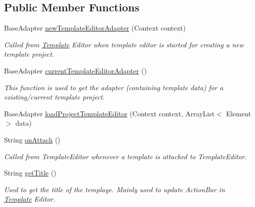 \subsection*{Public Member Functions}
\begin{DoxyCompactItemize}
\item 
Base\-Adapter \hyperlink{interfaceorg_1_1buildmlearn_1_1toolkit_1_1model_1_1TemplateInterface_af7d9d92709123fc39693504884e4f7e2}{new\-Template\-Editor\-Adapter} (Context context)
\begin{DoxyCompactList}\small\item\em Called from \hyperlink{enumorg_1_1buildmlearn_1_1toolkit_1_1model_1_1Template}{Template} Editor when template editor is started for creating a new template project. \end{DoxyCompactList}\item 
Base\-Adapter \hyperlink{interfaceorg_1_1buildmlearn_1_1toolkit_1_1model_1_1TemplateInterface_ae433eedc291006e78b65b0fc4135d560}{current\-Template\-Editor\-Adapter} ()
\begin{DoxyCompactList}\small\item\em This function is used to get the adapter (containing template data) for a existing/current template project. \end{DoxyCompactList}\item 
Base\-Adapter \hyperlink{interfaceorg_1_1buildmlearn_1_1toolkit_1_1model_1_1TemplateInterface_ac0637282a7f7b58a4e9b8e86a734bf93}{load\-Project\-Template\-Editor} (Context context, Array\-List$<$ Element $>$ data)
\item 
String \hyperlink{interfaceorg_1_1buildmlearn_1_1toolkit_1_1model_1_1TemplateInterface_af511bc9b58d176182a53397494d14238}{on\-Attach} ()
\begin{DoxyCompactList}\small\item\em Called from Template\-Editor whenever a template is attached to Template\-Editor. \end{DoxyCompactList}\item 
String \hyperlink{interfaceorg_1_1buildmlearn_1_1toolkit_1_1model_1_1TemplateInterface_a98a8592a7e4928ce76d0c61df17cf5c8}{get\-Title} ()
\begin{DoxyCompactList}\small\item\em Used to get the title of the templaye. Mainly used to update Action\-Bar in \hyperlink{enumorg_1_1buildmlearn_1_1toolkit_1_1model_1_1Template}{Template} Editor. \end{DoxyCompactList}\item 

\end{DoxyCompactItemize}
